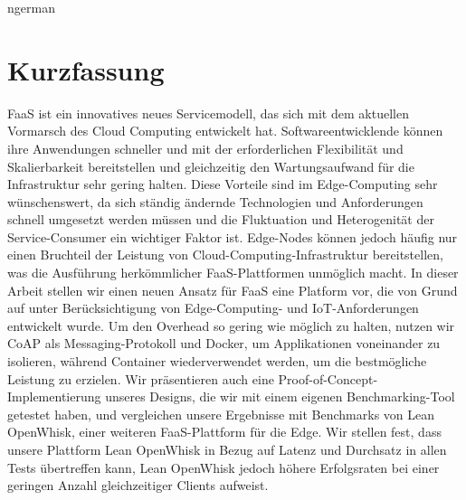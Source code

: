 \documentclass[a4paper, 11pt]{article}
\begin{document}
\clearpage
\begin{otherlanguage}
    {ngerman}
    \section*{Kurzfassung}
    FaaS ist ein innovatives neues Servicemodell, das sich mit dem aktuellen Vormarsch des Cloud Computing entwickelt hat.
    Softwareentwicklende können ihre Anwendungen schneller und mit der erforderlichen Flexibilität und Skalierbarkeit bereitstellen und gleichzeitig den Wartungsaufwand für die Infrastruktur sehr gering halten.
    Diese Vorteile sind im Edge-Computing sehr wünschenswert, da sich ständig ändernde Technologien und Anforderungen schnell umgesetzt werden müssen und die Fluktuation und Heterogenität der Service-Consumer ein wichtiger Faktor ist.
    Edge-Nodes können jedoch häufig nur einen Bruchteil der Leistung von Cloud-Computing-Infrastruktur bereitstellen, was die Ausführung herkömmlicher FaaS-Plattformen unmöglich macht.
    In dieser Arbeit stellen wir einen neuen Ansatz für FaaS eine Platform vor, die von Grund auf unter Berücksichtigung von Edge-Computing- und IoT-Anforderungen entwickelt wurde.
    Um den Overhead so gering wie möglich zu halten, nutzen wir CoAP als Messaging-Protokoll und Docker, um Applikationen voneinander zu isolieren, während Container wiederverwendet werden, um die bestmögliche Leistung zu erzielen.
    Wir präsentieren auch eine Proof-of-Concept-Implementierung unseres Designs, die wir mit einem eigenen Benchmarking-Tool getestet haben, und vergleichen unsere Ergebnisse mit Benchmarks von Lean OpenWhisk, einer weiteren FaaS-Plattform für die Edge.
    Wir stellen fest, dass unsere Plattform Lean OpenWhisk in Bezug auf Latenz und Durchsatz in allen Tests übertreffen kann, Lean OpenWhisk jedoch höhere Erfolgsraten bei einer geringen Anzahl gleichzeitiger Clients aufweist.
\end{otherlanguage}

\clearpage

\tableofcontents


\clearpage

\clearpage

\clearpage

\clearpage

\clearpage


\newpage
\printbibliography
\end{document}
